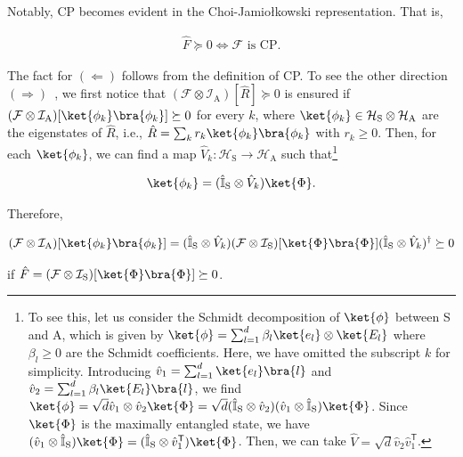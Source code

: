 \documentclass[preprint,pteplogo]{ptephy_v2}%
\numberwithin{equation}{section}
\theoremstyle{definition}
\newcommand{\ml}[1]{\mathcal{#1}}
\newcommand{\mr}[1]{\mathrm{#1}}
\newcommand{\mbb}[1]{\mathbb{#1}}
\newcommand{\aln}[1]{
\begin{align}
#1
\end{align}
}
\newcommand{\ra}{\rightarrow}
\begin{document}
Notably, CP becomes evident in the Choi-Jamiołkowski representation.
That is,
\aln{\label{positive_CP}
\hat{F}\succeq 0  \Longleftrightarrow \text{$\ml{F}$ is CP.}
}
The fact for $(\Longleftarrow)$ follows from the definition of CP. 
To see the other direction $(\Longrightarrow)$~\cite{wolf2012quantum}, we first notice that $(\ml{F}\otimes\ml{I}_\mr{A})[\hat{R}]\succeq 0$ is ensured if $(\ml{F}\otimes\ml{I}_\mr{A})[\ket{\phi_k}\bra{\phi_k}]\succeq 0$ for every $k$, where $\ket{\phi_k}\in\ml{H}_\mr{S}\otimes\ml{H}_\mr{A}$ are the eigenstates of $\hat{R}$, i.e.,  $\hat{R}=\sum_kr_k\ket{\phi_k}\bra{\phi_k}$ with $r_k\geq 0$.
Then, for each $\ket{\phi_k}$, we can find a map $\hat{V}_k:\ml{H}_\mr{S}\ra\ml{H}_\mr{A}$ such that\footnote{
To see this, let us consider the Schmidt decomposition of $\ket{\phi}$ between S and A, which is given by $\ket{\phi}=\sum_{l=1}^d\beta_l\ket{e_l}\otimes \ket{E_l}$ where $\beta_l\geq 0$ are the Schmidt coefficients. 
Here, we have omitted the subscript $k$ for simplicity. 
Introducing $\hat{v}_1=\sum_{l=1}^d\ket{e_l}\bra{l}$ and $\hat{v}_2=\sum_{l=1}^d\beta_l\ket{E_l}\bra{l}$, we find $\ket{\phi}=\sqrt{d}\hat{v}_1\otimes\hat{v}_2\ket{\Phi}=\sqrt{d}(\hat{\mbb{I}}_\mr{S}\otimes\hat{v}_2)(\hat{v}_1\otimes\hat{\mbb{I}}_\mr{S})\ket{\Phi}$. 
Since $\ket{\Phi}$ is the maximally entangled state, we have $(\hat{v}_1\otimes\hat{\mbb{I}}_\mr{S})\ket{\Phi}=(\hat{\mbb{I}}_\mr{S}\otimes \hat{v}_1^\mathsf{T})\ket{\Phi}$. 
Then, we can take $\hat{V}=\sqrt{d}\hat{v}_2\hat{v}_1^\mathsf{T}$.
} 
\aln{\label{phikisvkphi}
\ket{\phi_k}=(\hat{\mbb{I}}_\mr{S}\otimes\hat{V}_k)\ket{\Phi}.
}
Therefore, 
\aln{
(\ml{F}\otimes\ml{I}_\mr{A})[\ket{\phi_k}\bra{\phi_k}]
=(\hat{\mbb{I}}_\mr{S}\otimes\hat{V}_k)(\ml{F}\otimes \ml{I}_\mr{S})[\ket{\Phi}\bra{\Phi}]
(\hat{\mbb{I}}_\mr{S}\otimes\hat{V}_k)^\dag\succeq 0
}
if $\hat{F}=(\ml{F}\otimes \ml{I}_\mr{S})[\ket{\Phi}\bra{\Phi}]\succeq 0$.
\end{document}
